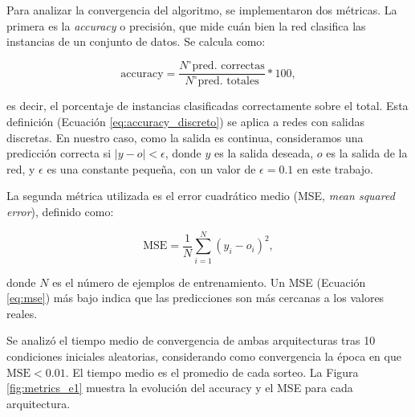 \documentclass[11pt, twocolumn]{article}
\begin{document}
Para analizar la convergencia del algoritmo, se implementaron dos métricas. La primera es la \textit{accuracy} o precisión, que mide cuán bien la red clasifica las instancias de un conjunto de datos. Se calcula como:

\begin{equation} \label{eq:accuracy_discreto}
  \text{accuracy} = \frac{N^\circ \text{pred. correctas}}{N^\circ \text{pred. totales}} * 100,
\end{equation}

\noindent es decir, el porcentaje de instancias clasificadas correctamente sobre el total. Esta definición (Ecuación \ref{eq:accuracy_discreto}) se aplica a redes con salidas discretas. En nuestro caso, como la salida es continua, consideramos una predicción correcta si \(|y - o| < \epsilon\), donde \(y\) es la salida deseada, \(o\) es la salida de la red, y \(\epsilon\) es una constante pequeña, con un valor de \(\epsilon = 0.1\) en este trabajo.

La segunda métrica utilizada es el error cuadrático medio (MSE, \textit{mean squared error}), definido como:

\begin{equation} \label{eq:mse}
  \text{MSE} = \frac{1}{N} \sum_{i=1}^N (y_i - o_i)^2,
\end{equation}

donde \(N\) es el número de ejemplos de entrenamiento. Un MSE (Ecuación \ref{eq:mse}) más bajo indica que las predicciones son más cercanas a los valores reales.

Se analizó el tiempo medio de convergencia de ambas arquitecturas tras 10 condiciones iniciales aleatorias, considerando como convergencia la época en que \(\text{MSE} < 0.01\). El tiempo medio es el promedio de cada sorteo. La Figura \ref{fig:metrics_e1} muestra la evolución del accuracy y el MSE para cada arquitectura.
\end{document}
